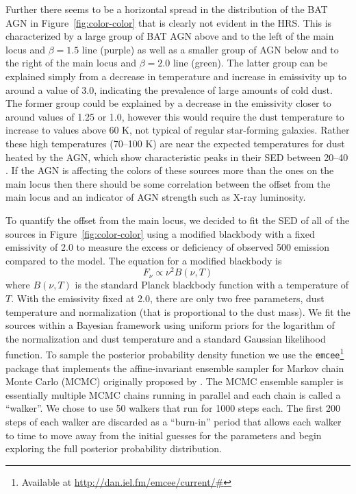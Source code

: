 Further there seems to be a horizontal spread in the distribution of the BAT AGN in Figure~\ref{fig:color-color} that is clearly not evident in the HRS. This is characterized by a large group of BAT AGN above and to the left of the main locus and $\beta=1.5$ line (purple) as well as a smaller group of AGN below and to the right of the main locus and $\beta=2.0$ line (green). The latter group can be explained simply from a decrease in temperature and increase in emissivity up to around a value of 3.0, indicating the prevalence of large amounts of cold dust. The former group could be explained by a decrease in the emissivity closer to around values of 1.25 or 1.0, however this would require the dust temperature to increase to values above 60 K, not typical of regular star-forming galaxies. Rather these high temperatures (70--100 K) are near the expected temperatures for dust heated by the AGN, which show characteristic peaks in their SED between 20--40 \um{} \citep{Richards:2006fj,Netzer:2007ve,Mullaney:2011yq}. If the AGN is affecting the colors of these sources more than the ones on the main locus then there should be some correlation between the offset from the main locus and an indicator of AGN strength such as X-ray luminosity. 

To quantify the offset from the main locus, we decided to fit the SED of all of the sources in Figure~\ref{fig:color-color} using a modified blackbody with a fixed emissivity of 2.0 to measure the excess or deficiency of observed 500 \um{} emission compared to the model. The equation for a modified blackbody is
\begin{equation}\label{eq:mod_blackbody}
F_{\nu} \propto \nu^{2}B(\nu, T)
\end{equation}
\noindent where $B(\nu, T)$ is the standard Planck blackbody function with a temperature of $T$. With the emissivity fixed at 2.0, there are only two free parameters, dust temperature and normalization (that is proportional to the dust mass). We fit the sources within a Bayesian framework using uniform priors for the logarithm of the normalization and dust temperature and a standard Gaussian likelihood function. To sample the posterior probability density function we use the \texttt{emcee}\footnote{Available at \url{http://dan.iel.fm/emcee/current/#}} package \citep{Foreman_Mackey_2013} that implements the affine-invariant ensemble sampler for Markov chain Monte Carlo (MCMC) originally proposed by \citet{Goodman_2010}. The MCMC ensemble sampler is essentially multiple MCMC chains running in parallel and each chain is called a ``walker''. We chose to use 50 walkers that run for 1000 steps each. The first 200 steps of each walker are discarded as a ``burn-in'' period that allows each walker to time to move away from the initial guesses for the parameters and begin exploring the full posterior probability distribution.

